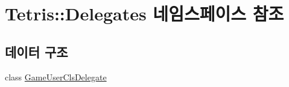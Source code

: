\hypertarget{namespace_tetris_1_1_delegates}{}\section{Tetris\+:\+:Delegates 네임스페이스 참조}
\label{namespace_tetris_1_1_delegates}
\subsection*{데이터 구조}
\begin{DoxyCompactItemize}
\item 
class \hyperlink{class_tetris_1_1_delegates_1_1_game_user_cls_delegate}{Game\+User\+Cls\+Delegate}
\end{DoxyCompactItemize}
